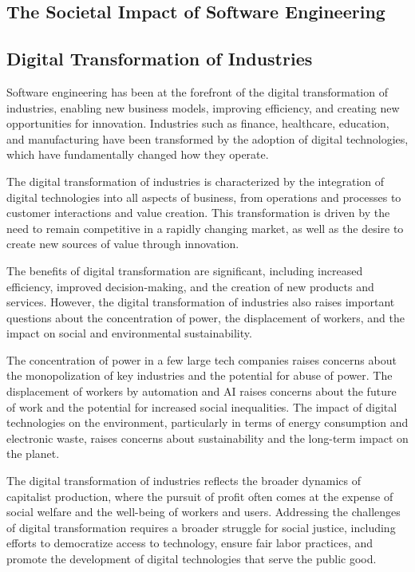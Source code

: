 \begin{refsection}
\section{The Societal Impact of Software Engineering}
\begin{multicols}{2}
{\small
\subsection{Digital Transformation of Industries}

Software engineering has been at the forefront of the digital transformation of industries, enabling new business models, improving efficiency, and creating new opportunities for innovation. Industries such as finance, healthcare, education, and manufacturing have been transformed by the adoption of digital technologies, which have fundamentally changed how they operate.

The digital transformation of industries is characterized by the integration of digital technologies into all aspects of business, from operations and processes to customer interactions and value creation. This transformation is driven by the need to remain competitive in a rapidly changing market, as well as the desire to create new sources of value through innovation.

The benefits of digital transformation are significant, including increased efficiency, improved decision-making, and the creation of new products and services. However, the digital transformation of industries also raises important questions about the concentration of power, the displacement of workers, and the impact on social and environmental sustainability.

The concentration of power in a few large tech companies raises concerns about the monopolization of key industries and the potential for abuse of power. The displacement of workers by automation and AI raises concerns about the future of work and the potential for increased social inequalities. The impact of digital technologies on the environment, particularly in terms of energy consumption and electronic waste, raises concerns about sustainability and the long-term impact on the planet.

The digital transformation of industries reflects the broader dynamics of capitalist production, where the pursuit of profit often comes at the expense of social welfare and the well-being of workers and users. Addressing the challenges of digital transformation requires a broader struggle for social justice, including efforts to democratize access to technology, ensure fair labor practices, and promote the development of digital technologies that serve the public good.

}
\end{multicols}
\end{refsection}
